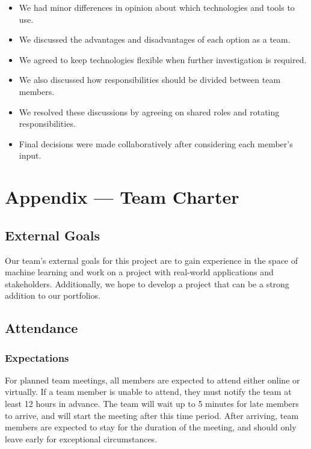 \documentclass{article}
\begin{document}
\begin{enumerate}
    \begin{itemize}
        \item We had minor differences in opinion about which technologies and tools to use.
        \item We discussed the advantages and disadvantages of each option as a team.
        \item We agreed to keep technologies flexible when further investigation is required.
        \item We also discussed how responsibilities should be divided between team members.
        \item We resolved these discussions by agreeing on shared roles and rotating responsibilities.
        \item Final decisions were made collaboratively after considering each member's input.
    \end{itemize}

\end{enumerate}

\newpage{}

\section*{Appendix --- Team Charter}

\subsection*{External Goals}

Our team's external goals for this project are to gain experience in the space of machine learning and work on a project with real-world applications and stakeholders.
Additionally, we hope to develop a project that can be a strong addition to our portfolios.

\subsection*{Attendance}

\subsubsection*{Expectations}

For planned team meetings, all members are expected to attend either online or virtually. If a team member is unable to attend, they must notify the team at least 12 hours in advance.
The team will wait up to 5 minutes for late members to arrive, and will start the meeting after this time period. After arriving, team members are expected to stay for the duration of the meeting,
and should only leave early for exceptional circumstances.
\end{document}
